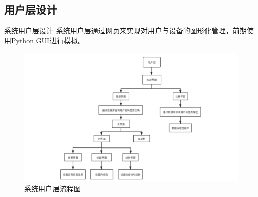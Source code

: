 \documentclass{beamer}
\begin{document}
\subsection{用户层设计}
\begin{frame}{系统用户层设计}
系统用户层通过网页来实现对用户与设备的图形化管理，前期使用Python GUI进行模拟。
    \begin{figure}[h]
            \centering
            \includegraphics[height=.6\textheight]{Picture/yh.png}
            \caption{系统用户层流程图}
            \label{系统用户层流程图}
        \end{figure}
\end{frame}
	
\end{document}
